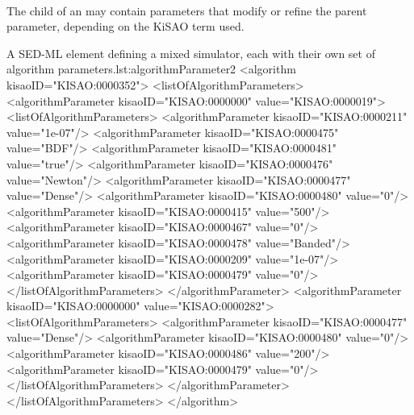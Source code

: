\begin{blockChanged}
\paragraph*{}
The child  of an \AlgorithmParameter may contain parameters that modify or refine the parent parameter, depending on the KiSAO term used.  

\begin{myXmlLst}{A SED-ML  element defining a mixed simulator, each with their own set of algorithm parameters.}{lst:algorithmParameter2}
<algorithm kisaoID="KISAO:0000352">
    <listOfAlgorithmParameters>
        <algorithmParameter kisaoID="KISAO:0000000" value="KISAO:0000019">
            <listOfAlgorithmParameters>
                <algorithmParameter kisaoID="KISAO:0000211" value="1e-07"/>
                <algorithmParameter kisaoID="KISAO:0000475" value="BDF"/>
                <algorithmParameter kisaoID="KISAO:0000481" value="true"/>
                <algorithmParameter kisaoID="KISAO:0000476" value="Newton"/>
                <algorithmParameter kisaoID="KISAO:0000477" value="Dense"/>
                <algorithmParameter kisaoID="KISAO:0000480" value="0"/>
                <algorithmParameter kisaoID="KISAO:0000415" value="500"/>
                <algorithmParameter kisaoID="KISAO:0000467" value="0"/>
                <algorithmParameter kisaoID="KISAO:0000478" value="Banded"/>
                <algorithmParameter kisaoID="KISAO:0000209" value="1e-07"/>
                <algorithmParameter kisaoID="KISAO:0000479" value="0"/>
            </listOfAlgorithmParameters>
        </algorithmParameter>
        <algorithmParameter kisaoID="KISAO:0000000" value="KISAO:0000282">
            <listOfAlgorithmParameters>
                <algorithmParameter kisaoID="KISAO:0000477" value="Dense"/>
                <algorithmParameter kisaoID="KISAO:0000480" value="0"/>
                <algorithmParameter kisaoID="KISAO:0000486" value="200"/>
                <algorithmParameter kisaoID="KISAO:0000479" value="0"/>
            </listOfAlgorithmParameters>
        </algorithmParameter>
    </listOfAlgorithmParameters>
</algorithm>
\end{myXmlLst}


\end{blockChanged}



